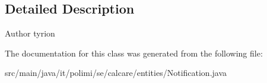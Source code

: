 \subsection{Detailed Description}
\begin{DoxyAuthor}{Author}
tyrion 
\end{DoxyAuthor}


The documentation for this class was generated from the following file\+:\begin{DoxyCompactItemize}
\item 
src/main/java/it/polimi/se/calcare/entities/Notification.\+java\end{DoxyCompactItemize}
